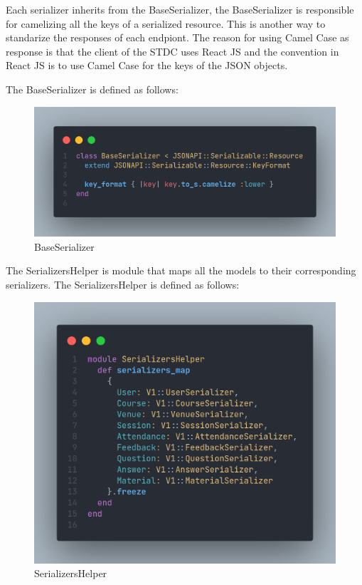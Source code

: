 \begin{justify}
    \vspace{0.25cm}
    \newendline Each serializer inherits from the BaseSerializer, the BaseSerializer is responsible for camelizing all the keys of a serialized resource. This is another way to standarize the responses of each endpiont. The reason for using Camel Case as response is that the client of the STDC uses React JS and the convention in React JS is to use Camel Case for the keys of the JSON objects.

    \vspace{0.25cm}
    \newendline The BaseSerializer is defined as follows:

    \begin{figure}[H]
        \centerline{\includegraphics[width=150mm,scale=1]{figures/implementation_and_testing/implementation/backend/base_serializer.png}}
        \caption{BaseSerializer}
    \end{figure}

    \vspace{0.25cm}
    \newendline The SerializersHelper is module that maps all the models to their corresponding serializers. The SerializersHelper is defined as follows:

    \begin{figure}[H]
        \centerline{\includegraphics[width=150mm,scale=1]{figures/implementation_and_testing/implementation/backend/serializers_helper.png}}
        \caption{SerializersHelper}
    \end{figure}



\end{justify}
